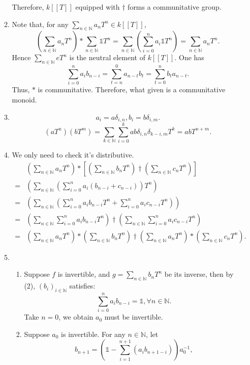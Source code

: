 \documentclass[12pt]{article}
\newcommand{\NN}{\mathbb{N}}
\begin{document}
\begin{enumerate}
\begin{enumerate}
            Therefore, $k[[T]]$ equipped with $\dagger$ forms a communitative group.
            \item Note that, for any $\sum_{n\in \NN}a_nT^n\in k[[T]]$,
            $$\left(\sum_{n\in \NN}a_nT^n\right)*\sum_{n\in \NN}\mathds{1}T^n=\sum_{n\in \NN}\left(\sum_{i=0}^{n}a_i\mathds{1}T^{n}\right)=\sum_{n\in \NN}a_nT^n.$$
            Hence $\sum_{n\in \NN}eT^n$ is the neutral element of $k[[T]]$. One has 
            $$\sum_{i=0}^{n}a_ib_{n-i}=\sum_{t=n}^{0}a_{n-t}b_t=\sum_{t=0}^{n}b_ta_{n-t}.$$
            Thus, $*$ is communitative. Therefore, what given is a communitative monoid.
            \item $$a_i=a\delta_{i,n}, b_i=b\delta_{i,m}.$$
                $$(aT^n)(bT^m)=\sum_{k\in \NN}\sum_{i=0}^{k}ab\delta_{i,n}\delta_{k-i,m}T^k=abT^{n+m}.$$
            \item We only need to check it's distributive.
                \begin{align*}
                     &\left(\sum_{n\in \NN}a_nT^n\right)*\left[\left(\sum_{n\in \NN}b_nT^n\right)\dagger\left(\sum_{n\in \NN}c_nT^n\right)\right]\\
                    =&\left(\sum_{n\in \NN}\left(\sum_{i=0}^{n}a_i(b_{n-i}+c_{n-i})\right)T^n\right)\\
                    =&\left(\sum_{n\in \NN}\left(\sum_{i=0}^{n}a_ib_{n-i}T^n+\sum_{i=0}^{n}a_ic_{n-i}T^n\right)\right)\\
                    =&\left(\sum_{n\in \NN}\sum_{i=0}^{n}a_ib_{n-i}T^n\right)\dagger\left(\sum_{n\in \NN}\sum_{i=0}^{n}a_ic_{n-i}T^n\right)\\
                    =&\left(\sum_{n\in \NN}a_nT^n\right)*\left(\sum_{n\in \NN}b_nT^n\right)\dagger\left(\sum_{n\in \NN}a_nT^n\right)*\left(\sum_{n\in \NN}c_nT^n\right).
                \end{align*}
            \item 
                \begin{enumerate}
                    \item Suppose $f$ is invertible, and $\displaystyle g=\sum_{n\in \NN}b_nT^n$ be its inverse, then by (2), $(b_i)_{i\in \NN}$ satisfies:
                        $$\sum_{i=0}^{n}a_ib_{n-i}=\mathds{1},\forall n\in \NN.$$
                        Take $n=0$, we obtain $a_0$ must be invertible.
                    \item Suppose $a_0$ is invertible. For any $n\in \NN$, let 
                        $$b_{n+1}=\left(\mathds{1}-\sum_{i=1}^{n+1}(a_ib_{n+1-i})\right)a_0^{-1},$$

\end{enumerate}
\end{enumerate}
\end{enumerate}
\end{document}
